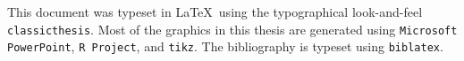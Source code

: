 \thispagestyle{empty}

\hfill

\vfill

\noindent{}

\vspace{0.4cm}

\noindent This document was typeset in \LaTeX\ using the typographical look-and-feel \texttt{classicthesis}. Most of the graphics in this thesis are  generated using \texttt{Microsoft PowerPoint}, \texttt{R Project}, and \texttt{tikz}. The bibliography is typeset using \texttt{biblatex}.